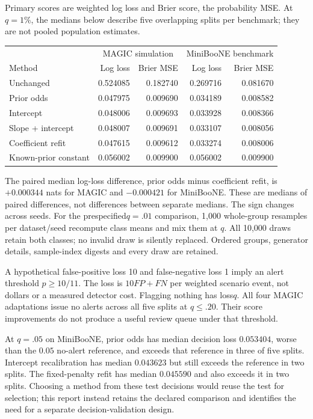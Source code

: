 \documentclass[10pt]{article}
\newcommand{\smallhead}[1]{\vspace{6pt}{\large\bfseries #1}\par}
\begin{document}
\smallhead{What the held-out scores say}
Primary scores are weighted log loss and Brier score, the probability MSE. At $q=1\%$, the medians below describe five overlapping splits per benchmark; they are not pooled population estimates.
\begin{center}\small
\setlength{\tabcolsep}{9pt}
\begin{tabular}{lrrrr}
\toprule
&\multicolumn{2}{c}{MAGIC simulation}&\multicolumn{2}{c}{MiniBooNE benchmark}\\
Method&Log loss&Brier MSE&Log loss&Brier MSE\\\midrule
Unchanged&0.524085&0.182740&0.269716&0.081670\\
Prior odds&0.047975&0.009690&0.034189&0.008582\\
Intercept&0.048006&0.009693&0.033928&0.008366\\
Slope + intercept&0.048007&0.009691&0.033107&0.008056\\
Coefficient refit&0.047615&0.009612&0.033274&0.008006\\
Known-prior constant&0.056002&0.009900&0.056002&0.009900\\\bottomrule
\end{tabular}
\end{center}
The paired median log-loss difference, prior odds minus coefficient refit, is $+0.000344$ nats for MAGIC and $-0.000421$ for MiniBooNE. These are medians of paired differences, not differences between separate medians. The sign changes across seeds. For the prespecified$q=.01$ comparison, 1,000 whole-group resamples per dataset/seed recompute class means and mix them at $q$. All 10,000 draws retain both classes; no invalid draw is silently replaced. Ordered groups, generator details, sample-index digests and every draw are retained.

\smallhead{Where score improvement fails to become decision value}
A hypothetical false-positive loss 10 and false-negative loss 1 imply an alert threshold $p\ge10/11$. The loss is $10FP+FN$ per weighted scenario event, not dollars or a measured detector cost. Flagging nothing has loss$q$. All four MAGIC adaptations issue no alerts across all five splits at $q\le.20$. Their score improvements do not produce a useful review queue under that threshold.

At $q=.05$ on MiniBooNE, prior odds has median decision loss $0.053404$, worse than the $0.05$ no-alert reference, and exceeds that reference in three of five splits. Intercept recalibration has median $0.043623$ but still exceeds the reference in two splits. The fixed-penalty refit has median $0.045590$ and also exceeds it in two splits. Choosing a method from these test decisions would reuse the test for selection; this report instead retains the declared comparison and identifies the need for a separate decision-validation design.
\end{document}
